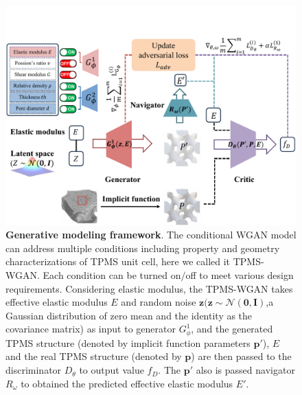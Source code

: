 \documentclass[preprint,review,12pt,authoryear]{elsarticle}
\begin{document}
\begin{figure}
    \centering
    \includegraphics[width=1\linewidth]{figures/3.pdf}        
    \caption{\textbf{Generative modeling framework}. The conditional WGAN model can address multiple conditions including property and geometry characterizations of TPMS unit cell, here we called it TPMS-WGAN. Each condition can be turned on$/$off to meet various design requirements. Considering elastic modulus, the TPMS-WGAN takes effective elastic modulus $E$ and random noise $\boldsymbol{z} (\boldsymbol{z}\sim\mathcal{N}(\mathbf{0},\mathbf{I})$,a Gaussian distribution of zero mean and the identity as the covariance matrix) as input to generator $G_\phi^1$, and the generated TPMS structure (denoted by implicit function parameters $\boldsymbol{p}'$), $E$ and the real TPMS structure (denoted by $\boldsymbol{p}$) are then passed to the discriminator $D_\theta$ to output value $f_D$. The $\boldsymbol{p}'$ also is passed navigator $R_\omega$ to obtained the predicted effective elastic modulus $E'$.}
    \label{fig:3}
\end{figure}
  
\end{document}
